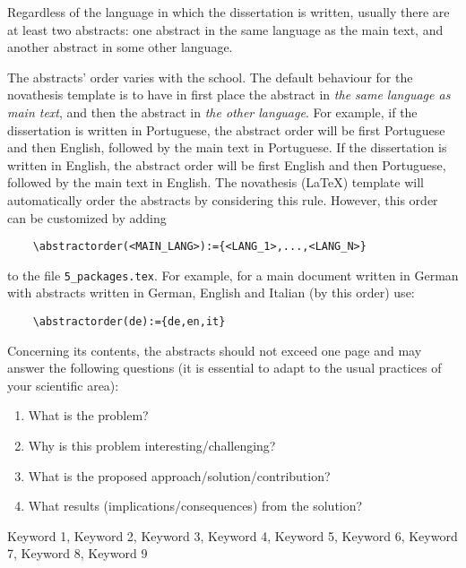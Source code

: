 
%

Regardless of the language in which the dissertation is written, usually there are at least two abstracts: one abstract in the same language as the main text, and another abstract in some other language.

The abstracts' order varies with the school.  The default behaviour for the \gls{novathesis} template is to have in first place the abstract in \emph{the same language as main text}, and then the abstract in \emph{the other language}. For example, if the dissertation is written in Portuguese, the abstract order will be first Portuguese and then English, followed by the main text in Portuguese. If the dissertation is written in English, the abstract order will be first English and then Portuguese, followed by the main text in English. 
%
The \gls{novathesis} (\LaTeX) template will automatically order the abstracts by considering this rule. However, this order can be customized by adding
\begin{verbatim}
    \abstractorder(<MAIN_LANG>):={<LANG_1>,...,<LANG_N>}
\end{verbatim}
\noindent to the file \verb!5_packages.tex!.  For example, for a main document written in German with abstracts written in German, English and Italian (by this order) use:
\begin{verbatim}
    \abstractorder(de):={de,en,it}
\end{verbatim}

Concerning its contents, the abstracts should not exceed one page and may answer the following questions (it is essential to adapt to the usual practices of your scientific area):

\begin{enumerate}
  \item What is the problem?
  \item Why is this problem interesting/challenging?
  \item What is the proposed approach/solution/contribution?
  \item What results (implications/consequences) from the solution?
\end{enumerate}

\begin{keywords}
Keyword 1, Keyword 2, Keyword 3, Keyword 4, Keyword 5, Keyword 6, Keyword 7, Keyword 8, Keyword 9
\end{keywords} 

